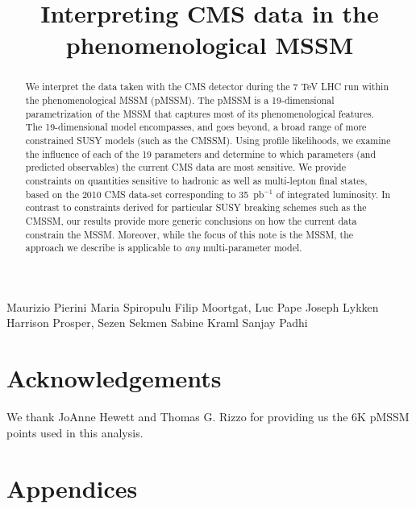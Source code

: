 \documentclass{cmspaper}
\begin{document}
%
\begin{titlepage}
\title{Interpreting CMS data in the phenomenological MSSM}

  \begin{Authlist}
    Maurizio Pierini
    Maria Spiropulu
    Filip Moortgat, Luc Pape
    Joseph Lykken
    Harrison Prosper, Sezen Sekmen
    Sabine Kraml
    Sanjay Padhi
    
  \end{Authlist}

\begin{abstract}
We interpret the data taken with the CMS detector during the 7 TeV LHC run within the phenomenological MSSM (pMSSM). 
The pMSSM is a 19-dimensional parametrization of the MSSM that captures most of its phenomenological features. The 19-dimensional model
encompasses, and goes beyond, a broad range of more constrained SUSY models (such as the CMSSM). 
Using profile likelihoods, we examine the influence of each of the 
19 parameters and determine to which parameters 
(and predicted observables) the current CMS data are most sensitive. 
We provide constraints on quantities sensitive to hadronic as well as multi-lepton final states, 
based on the 2010 CMS data-set corresponding to 35~pb$^{-1}$ of integrated luminosity.
In contrast to constraints derived for particular SUSY breaking schemes 
such as the CMSSM, our results provide more generic conclusions on how the current 
data constrain the MSSM. 
Moreover, while the focus of this note is the 
MSSM, the approach we describe is applicable to \emph{any} multi-parameter model.
\end{abstract}
\end{titlepage}




%




\section*{Acknowledgements}

We thank JoAnne Hewett and Thomas G. Rizzo for providing us the 6K pMSSM points used in this analysis.



%
%
\clearpage


\clearpage
\appendices
\section*{Appendices}

\clearpage

\end{document}

